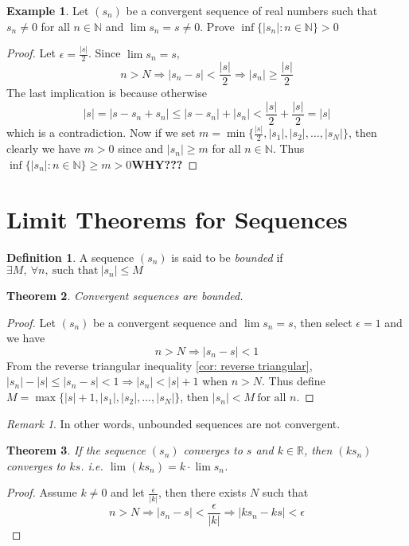 \documentclass[12pt, lettersize]{book}
\theoremstyle{plain}
\newtheorem{thm}{Theorem}[section]
\theoremstyle{definition}
\newtheorem{dfn}[thm]{Definition}
\newtheorem*{eg}{Example}
\theoremstyle{remark}
\newtheorem*{rem}{Remark}
\begin{document}
		\begin{eg}
		Let $(s_n)$ be a convergent sequence of real numbers such that $s_n\neq0$ for all $n\in \mathbb{N}$ and $\lim s_n=s
		\neq0$. Prove $\inf\{|s_n|: n\in\mathbb{N}\}>0$
		\end{eg}
		\begin{proof}
		Let $\epsilon=\frac{|s|}{2}$. Since $\lim s_n=s$,
		\begin{displaymath}
			n>N \Rightarrow |s_n-s|<\frac{|s|}{2} \Rightarrow |s_n|\geq\frac{|s|}{2}
		\end{displaymath}
		The last implication is because otherwise 
		\begin{displaymath}
			|s|=|s-s_n+s_n|\leq|s-s_n|+|s_n|<\frac{|s|}{2}+\frac{|s|}{2}=|s|
		\end{displaymath}
		which is a contradiction. Now if we set $m=\min\{\frac{|s|}{2},|s_1|,|s_2|,\dots,|s_N|\}$, then clearly we have
		$m>0$ since and $|s_n|\geq m$ for all $n\in \mathbb{N}$. Thus $\inf\{|s_n|: n\in\mathbb{N}\}\geq m>0$\textbf{WHY???} 
		\end{proof}
		\newpage
	\section{Limit Theorems for Sequences}
		\begin{dfn}\label{def:bound}
		A sequence $(s_n)$ is said to be \emph{bounded} if $\exists M,\ \forall n,\ \text{such that}\ |s_n|\leq M$
		\end{dfn}
		
		\begin{thm}\label{def:convergence is bounded}
		Convergent sequences are bounded.
		\end{thm}
		\begin{proof}
		Let $(s_n)$ be a convergent sequence and $\lim s_n=s$, then select $\epsilon=1$ and we have
		\begin{displaymath}
			n>N \Rightarrow |s_n-s|<1
		\end{displaymath}
		From the reverse triangular inequality \ref{cor: reverse triangular}, $|s_n|-|s|\leq|s_n-s|<1 \Rightarrow |s_n|<|s|+1$ when $n>N$. Thus define $M=\max\{|s|+1,|s_1|,|s_2|,\dots,|s_N|\}$, then $|s_n|<M\ \text{for all $n$}$. 	
		\end{proof}
		\begin{rem}
			In other words, unbounded sequences are not convergent.
		\end{rem}
		
		\begin{thm}
		If the sequence $(s_n)$ converges to $s$ and $k\in\mathbb{R}$, then $(ks_n)$ converges to $ks$. i.e. $\lim(ks_n)=k\cdot\lim s_n$.
		\end{thm}
		\begin{proof}
		Assume $k\neq0$ and let $\frac{\epsilon}{|k|}$, then there exists $N$ such that
		\begin{displaymath}
			n>N \Rightarrow |s_n-s|<\frac{\epsilon}{|k|} \Rightarrow |ks_n-ks|<\epsilon
		\end{displaymath}
		\end{proof}
		
\end{document}

